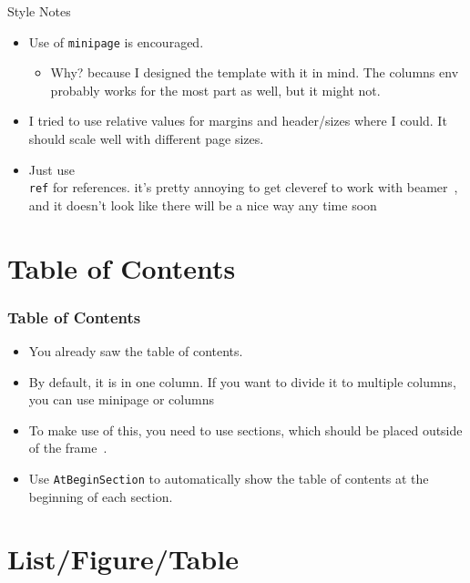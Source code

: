 \documentclass[
	10pt, %
	aspectratio=169, %
]{beamer}
\begin{document}
\begin{frame}{Style Notes}
	\begin{itemize}
		\item Use of \texttt{minipage} is encouraged.
		      \begin{itemize}
			      \item Why? because I designed the template with it in mind. The columns env probably works for the most part as well, but it might not.
		      \end{itemize}
		\item I tried to use relative values for margins and header/sizes where I could. It should scale well with different page sizes.
		\item Just use \texttt{\\ref} for references. it's pretty annoying to get cleveref to work with beamer~\cite{cleveref_beamer}, and it doesn't look like there will be a nice way any time soon~\cite{}
	\end{itemize}
\end{frame}


\section{Table of Contents}
\begin{frame}
	\frametitle{Table of Contents}
	\begin{itemize}
		\item You already saw the table of contents.
		\item By default, it is in one column. If you want to divide it to multiple columns, you can use minipage or columns~\cite{samcarter_is_at_topanswers.xyzAnswerBeamerVertical2013}
		\item To make use of this, you need to use sections, which should be placed outside of the frame~\cite{campaAnswerAtbeginsectionReturns2022}.
		\item Use \texttt{AtBeginSection} to automatically show the table of contents at the beginning of each section.
	\end{itemize}
\end{frame}


\section{List/Figure/Table}
\end{document}
